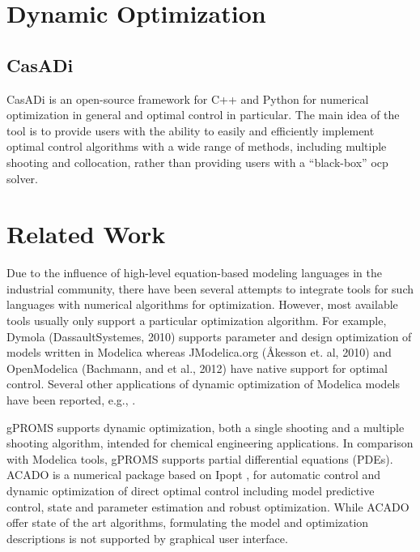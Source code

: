 \section{Dynamic Optimization}
\label{sec:dynamicoptimization}

\subsection{CasADi}
\label{sec:casadi}

CasADi \cite{casadi} is an open-source framework for C++ and Python for numerical optimization in general and optimal control in particular. The main idea of the tool is to provide users with the ability to easily and efficiently implement optimal control algorithms with a wide range of methods, including multiple shooting and collocation, rather than providing users with a “black-box” \acrshort{ocp} solver.

\section{Related Work}
\label{sec:relatedwork}

Due to the influence of high-level equation-based modeling languages in the industrial community, there have been several attempts to integrate tools for such languages with numerical algorithms for optimization. However, most available tools usually only support a particular optimization algorithm. For example, Dymola (DassaultSystemes, 2010) supports parameter and design optimization of models written in Modelica whereas JModelica.org (Åkesson et. al, 2010) and OpenModelica (Bachmann, and et al., 2012) have native support for optimal control. Several other applications of dynamic optimization of Modelica models have been reported, e.g., \cite{relatedworkjohan,relatedworkfranke, relatedworklarson,relatedworkjan, relatedworkprolss}. 

gPROMS \cite{gproms} supports dynamic optimization, both a single shooting and a multiple shooting algorithm, intended for chemical engineering applications. In comparison with Modelica tools, gPROMS supports partial differential equations (PDEs).  ACADO \cite{acado,acadoboris}is a numerical package based on Ipopt \cite{wachter,ipopt}, for automatic control and dynamic optimization of direct optimal control including model predictive control, state and parameter estimation and robust optimization. While ACADO offer state of the art algorithms, formulating the model and optimization descriptions is not supported by graphical user interface. 


